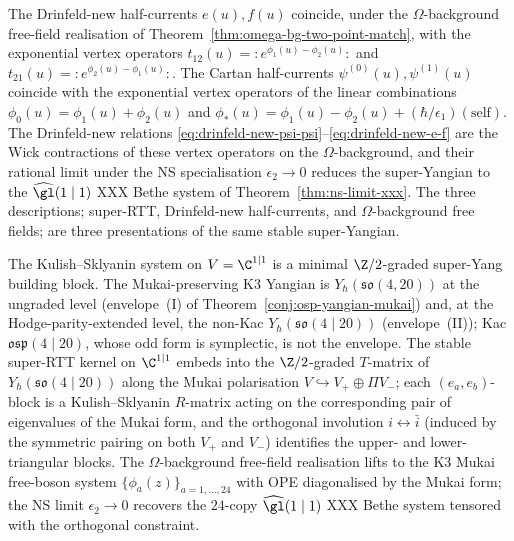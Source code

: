 \begin{remark}
\label{rem:drinfeld-new-omega-identification}
The Drinfeld-new half-currents $e(u), f(u)$ coincide, under the
$\Omega$-background free-field realisation of
Theorem~\ref{thm:omega-bg-two-point-match}, with the exponential
vertex operators $t_{12}(u) = :e^{\phi_1(u) - \phi_2(u)}:$ and
$t_{21}(u) = :e^{\phi_2(u) - \phi_1(u)}:$. The Cartan half-currents
$\psi^{(0)}(u), \psi^{(1)}(u)$ coincide with the exponential vertex
operators of the linear combinations
$\phi_0(u) = \phi_1(u) + \phi_2(u)$ and
$\phi_*(u) = \phi_1(u) - \phi_2(u) + (\hbar/\epsilon_1)(\text{self})$.
The Drinfeld-new relations
\eqref{eq:drinfeld-new-psi-psi}--\eqref{eq:drinfeld-new-e-f} are the
Wick contractions of these vertex operators on the
$\Omega$-background, and their rational limit under the NS
specialisation $\epsilon_2 \to 0$ reduces the super-Yangian to the
$\widehat{\gl}(1 \mid 1)$ XXX Bethe system of
Theorem~\ref{thm:ns-limit-xxx}. The three descriptions; super-RTT,
Drinfeld-new half-currents, and $\Omega$-background free fields; are
three presentations of the same stable super-Yangian.
\end{remark}

\begin{remark}
\label{rem:ks-to-osp-lift}
The Kulish--Sklyanin system on $V = \C^{1 \mid 1}$ is a minimal
$\Z/2$-graded super-Yang building block. The Mukai-preserving K$3$
Yangian is $Y_\hbar(\mathfrak{so}(4, 20))$ at the ungraded level
(envelope~(I) of Theorem~\ref{conj:osp-yangian-mukai}) and, at
the Hodge-parity-extended level, the non-Kac
$Y_\hbar(\mathfrak{so}(4 \mid 20))$ (envelope~(II)); Kac
$\mathfrak{osp}(4 \mid 20)$, whose odd form is symplectic, is not
the envelope. The stable super-RTT kernel on $\C^{1 \mid 1}$ embeds
into the $\Z/2$-graded $T$-matrix of
$Y_\hbar(\mathfrak{so}(4 \mid 20))$ along the Mukai polarisation
$V \hookrightarrow V_+ \oplus \Pi V_-$; each $(e_a, e_b)$-block is
a Kulish--Sklyanin $R$-matrix acting on the corresponding pair of
eigenvalues of the Mukai form, and the orthogonal involution
$i \leftrightarrow \bar i$ (induced by the symmetric pairing on
both $V_+$ and $V_-$) identifies the upper- and lower-triangular
blocks. The $\Omega$-background free-field realisation lifts to the
K3 Mukai free-boson system $\{\phi_a(z)\}_{a = 1, \ldots, 24}$ with
OPE diagonalised by the Mukai form; the NS limit
$\epsilon_2 \to 0$ recovers the $24$-copy
$\widehat{\gl}(1 \mid 1)$ XXX Bethe system tensored with the
orthogonal constraint.
\end{remark}

